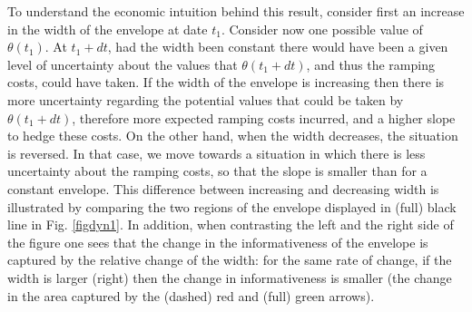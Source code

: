 To understand the economic intuition behind this result, consider first an increase in the width of the envelope at date $t_1$.  Consider now one possible value of $\theta(t_1)$. At $t_1+dt$, had the width been constant there would have been a given level of uncertainty about the values that $\theta(t_1+dt)$, and thus the ramping costs, could have taken.  If the width of the envelope is increasing then there is more uncertainty regarding the potential values that could be taken by $\theta(t_1+dt)$, therefore more expected ramping costs incurred, and a higher slope to hedge these costs. On the other hand, when the width decreases, the situation is reversed. In that case, we move towards a situation in which there is less uncertainty about the ramping costs, so that the slope is smaller than for a constant envelope. This difference between increasing and decreasing width is illustrated by comparing the two regions of the envelope displayed in (full) black line in Fig. \ref{figdyn1}. In addition, when contrasting the left and the right side of the figure one sees that the change in the informativeness of the envelope is captured by the relative change of the width: for the same rate of change, if the width is larger (right) then the change in informativeness is smaller (the change in the area captured by the (dashed) red and (full) green arrows).  \\

